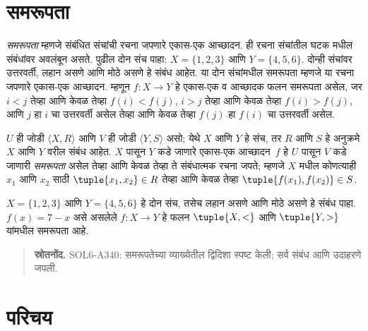 \section{समरूपता}\label{sfr:fun:iso:sec}

\begin{explain}
\emph{समरूपता} म्हणजे संबंधित संचांची रचना जपणारे एकास-एक
आच्छादन. ही रचना संचांतील घटक मधील संबंधांवर अवलंबून
असते. पुढील दोन संच पाहा: $X=\{1,2,3\}$ आणि $Y=\{4,5,6\}$.
दोन्ही संचांवर उत्तरवर्ती, लहान असणे आणि मोठे असणे हे संबंध
आहेत. या दोन संचांमधील समरूपता म्हणजे या रचना जपणारे
एकास-एक आच्छादन. म्हणून $f \colon X
\to Y$ हे एकास-एक व आच्छादक फलन समरूपता असेल, जर
$i<j$ तेव्हा आणि केवळ तेव्हा $f(i)<f(j)$, $i>j$ तेव्हा आणि केवळ तेव्हा $f(i)>f(j)$, आणि $j$ हा $i$ चा उत्तरवर्ती असेल
तेव्हा आणि केवळ तेव्हा $f(j)$ हा $f(i)$ चा उत्तरवर्ती असेल.
\end{explain}

\begin{defn}[समरूपता]
$U$ ही जोडी $\langle X, R\rangle$ आणि $V$ ही जोडी $\langle
Y, S\rangle$ असो; येथे $X$ आणि $Y$ हे संच, तर $R$ आणि $S$ हे
अनुक्रमे $X$ आणि $Y$ वरील संबंध आहेत. $X$ पासून $Y$ कडे जाणारे
एकास-एक आच्छादन~$f$ हे $U$ पासून $V$ कडे जाणारी \emph{समरूपता}
असेल तेव्हा आणि केवळ तेव्हा ते संबंधात्मक रचना जपते; म्हणजे
$X$ मधील कोणत्याही $x_{1}$ आणि $x_{2}$ साठी
$\tuple{x_1,x_2} \in R$ तेव्हा आणि केवळ तेव्हा
$\tuple{f(x_1),f(x_2)} \in S$.
\end{defn}

\begin{ex}
$X=\{1,2,3\}$ आणि $Y=\{4,5,6\}$ हे दोन संच, तसेच
लहान असणे आणि मोठे असणे हे संबंध पाहा. $f(x) = 7-x$ असे
असलेले $f\colon X \to
Y$ हे फलन $\tuple{X,<}$ आणि $\tuple{Y,>}$ यांमधील
समरूपता आहे.
\end{ex}



\begin{quote}\small\textbf{स्रोतनोंद.} SOL6-A340: समरूपतेच्या व्याख्येतील द्विदिशा स्पष्ट केली; सर्व संबंध आणि उदाहरणे जपली.\end{quote}











\section{परिचय}\label{sfr:ind:int:sec}

